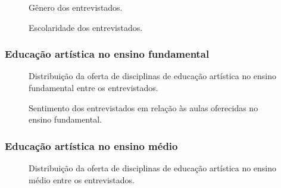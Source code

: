 \documentclass[12pt, a4paper]{article}
\begin{document}
\begin{figure}[H]
	\centering
	\caption{Gênero dos entrevistados.}
	\label{fig:q2}
\end{figure}

\begin{figure}[H]
	\centering
	\caption{Escolaridade dos entrevistados.}
	\label{fig:q3}
\end{figure}

\subsubsection{Educação artística no ensino fundamental}
\begin{figure}[H]
	\centering
	\caption{Distribuição da oferta de disciplinas de educação artística no ensino fundamental entre os entrevistados.}
	\label{fig:q4}
\end{figure}

\begin{figure}[H]
	\centering
	\caption{Sentimento dos entrevistados em relação às aulas oferecidas no ensino fundamental.}
	\label{fig:q5}
\end{figure}

\subsubsection{Educação artística no ensino médio}
\begin{figure}[H]
	\centering
	\caption{Distribuição da oferta de disciplinas de educação artística no ensino médio entre os entrevistados.}
	\label{fig:q6}
\end{figure}
\end{document}
